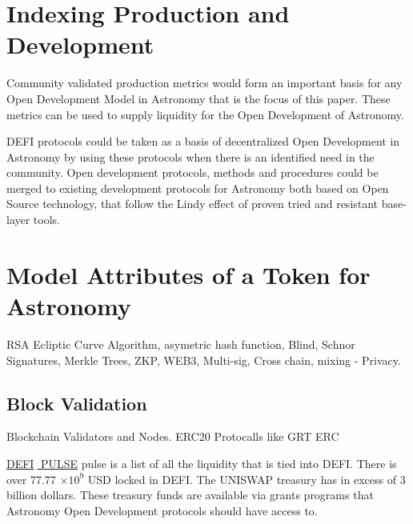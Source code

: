 \documentclass[final,5p,times,twocolumn,authoryear]{elsarticle}
\begin{document}
\section{Indexing Production and Development}

Community validated production metrics would form an important basis for any Open Development Model in Astronomy that is the focus of this paper. These metrics can be used to supply liquidity for the Open Development of Astronomy.  

DEFI protocols could be taken as a basis of decentralized Open Development in Astronomy by using these protocols when there is an identified need in the community. Open development protocols, methods and procedures could be merged to existing development protocols for Astronomy both  based on Open Source technology, that follow the Lindy effect of proven tried and resistant base-layer tools.
 
 \section{Model Attributes of a Token for Astronomy}
\label{sec:btc4}
RSA Ecliptic Curve Algorithm, asymetric hash function, Blind, Schnor Signatures, Merkle Trees, ZKP,  WEB3, Multi-sig, Cross chain, mixing - Privacy. 

\subsection{Block Validation}
\label{subsec: validator}
Blockchain Validators and Nodes. ERC20 Protocalls like GRT ERC   

\href{https://defipulse.com/}{DEFI$\;$ PULSE} pulse is a list of all the liquidity that is tied into DEFI. There is over 77.77 $\times 10^{9}$ USD locked in DEFI. The UNISWAP treasury has in excess of 3 billion dollars. These treasury funds are available via grants programs that Astronomy Open Development protocols should have access to.
\end{document}
